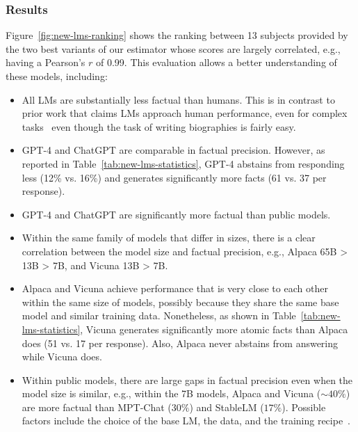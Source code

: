 \subsubsection{Results}
Figure~\ref{fig:new-lms-ranking} shows the ranking between 13 subjects provided by the two best variants of our estimator whose scores are largely correlated, e.g., having a Pearson's $r$ of 0.99.
This evaluation allows a better understanding of these models, including:\vspace{-.3em}
\begin{itemize}[leftmargin=12pt]\itemsep -.2em
    \item All LMs are substantially less factual than humans. This is in contrast to prior work that claims LMs approach human performance, even for complex tasks~\citep{ding2022gpt,nori2023capabilities,lee2023benefits} even though the task of writing  biographies is fairly easy.
    \item GPT-4 and ChatGPT are comparable in factual precision. However, as reported in Table~\ref{tab:new-lms-statistics}, GPT-4 abstains from responding less (12\% vs. 16\%) and generates significantly more facts (61 vs. 37 per response).
    \item GPT-4 and ChatGPT are significantly more factual than public models.
    \item Within the same family of models that differ in sizes, there is a clear correlation between the model size and factual precision, e.g., Alpaca 65B > 13B > 7B, and Vicuna 13B > 7B.
    \item Alpaca and Vicuna achieve performance that is very close to each other within the same size of models, possibly because they share the same base model and similar training data.
    Nonetheless, as shown in Table~\ref{tab:new-lms-statistics}, 
    Vicuna generates significantly more atomic facts than Alpaca does (51 vs. 17 per response). Also, Alpaca never abstains from answering while Vicuna does. %
    \item Within public models, there are large gaps in factual precision even when the model size is similar, e.g., within the 7B models, Alpaca and Vicuna ($\sim40\%$) are more factual than MPT-Chat ($30\%$) and StableLM ($17\%$).
    Possible factors include the choice of the base LM, the data, and the training recipe~\citep{hoffmann2022training}. %
\end{itemize}

